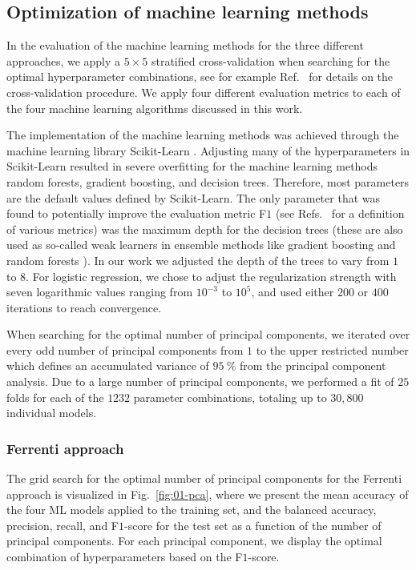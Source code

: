 \documentclass[superscriptaddress,unsortedaddress,
 amsmath,amssymb,
 aps,
]{revtex4-2}
\begin{document}
\subsection*{Optimization of machine learning methods}

In the evaluation of the machine learning methods for the three different approaches, we apply a $5\times 5$ stratified cross-validation when searching for the optimal hyperparameter combinations, see for example Ref.~\cite{Hastie2009} for details on the cross-validation procedure. We apply four different evaluation metrics to each of the four machine learning algorithms discussed in this work. 

The implementation of the machine learning methods was achieved through the machine learning library Scikit-Learn \cite{Pedregosa2012}. Adjusting many of the hyperparameters in Scikit-Learn resulted in severe overfitting for the machine learning methods random forests, gradient boosting, and decision trees. Therefore, most parameters are the default values defined by Scikit-Learn. The only parameter that was found to potentially improve the evaluation metric F$1$  (see Refs.~\cite{sammut2010,geron2022} for a definition of various metrics) was the maximum depth for the decision trees (these are also used as so-called weak learners in ensemble methods like gradient boosting and random forests \cite{geron2022}). In our work we adjusted 
the depth of the trees to vary from $1$ to $8$. For logistic regression, we chose to adjust the regularization strength with seven logarithmic values ranging from $10^{-3}$ to $10^{5}$, and used either $200$ or $400$ iterations to reach convergence. 

When searching for the optimal number of principal components, we iterated over every odd number of principal components from $1$ to the upper restricted number which defines an accumulated variance of $95 \ \%$ from the principal component analysis. Due to a large number of principal components, we performed a fit of  $25$ folds for each of the $1232$ parameter combinations, totaling up to $30,800$ individual models. 


\subsubsection*{Ferrenti approach}
The grid search for the optimal number of principal components for the Ferrenti approach is visualized in Fig.~\ref{fig:01-pca}, where we present the mean accuracy of the four ML models applied to the training set, and the balanced accuracy, precision, recall, and F$1$-score 
for the test set as a function of the number of principal components. For each principal component, we display the optimal combination of  hyperparameters based on the F$1$-score. 
\end{document}
